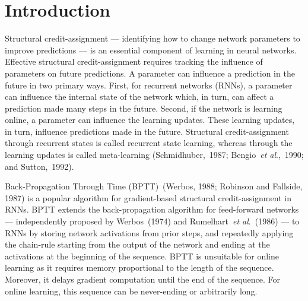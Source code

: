 \documentclass{article}
\newcommand{\etal}{\textit{et al}.}
\begin{document}
\section{Introduction}
Structural credit-assignment --- identifying how to change network parameters to improve predictions --- is an essential component of learning in neural networks. Effective structural credit-assignment requires tracking the influence of parameters on future predictions. A parameter can influence a prediction in the future in two primary ways. First, for recurrent networks (RNNs), a parameter can influence the internal state of the network which, in turn, can affect a prediction made many steps in the future. Second, if the network is learning online, a parameter can influence the learning updates. These learning updates, in turn, influence predictions made in the future. Structural credit-assignment through recurrent states is called recurrent state learning, whereas through the learning updates is called meta-learning (Schmidhuber,~1987; Bengio~\etal,~1990; and Sutton,~1992). 

Back-Propagation Through Time (BPTT)~(Werbos, 1988; Robinson and Fallside, 1987) is a popular algorithm for gradient-based structural credit-assignment in RNNs. BPTT extends the back-propagation algorithm for feed-forward networks --- independently proposed by Werbos~(1974) and Rumelhart~\etal~(1986) --- to RNNs by storing network activations from prior steps, and repeatedly applying the chain-rule starting from the output of the network and ending at the activations at the beginning of the sequence. BPTT is unsuitable for online learning as it requires memory proportional to the length of the sequence. Moreover, it delays gradient computation until the end of the sequence. For online learning, this sequence can be never-ending or arbitrarily long. 





\end{document}
